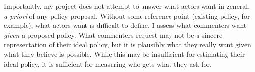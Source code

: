 
Importantly, my project does not attempt to answer what actors want in general, \textit{a priori} of any policy proposal. Without some reference point (existing policy, for example), what actors want is difficult to define. I assess what commenters want \textit{given} a proposed policy. What commenters request may not be a sincere representation of their ideal policy, but it is plausibly what they really want given what they believe is possible. While this may be insufficient for estimating their ideal policy, it is sufficient for measuring who gets what they ask for. 


